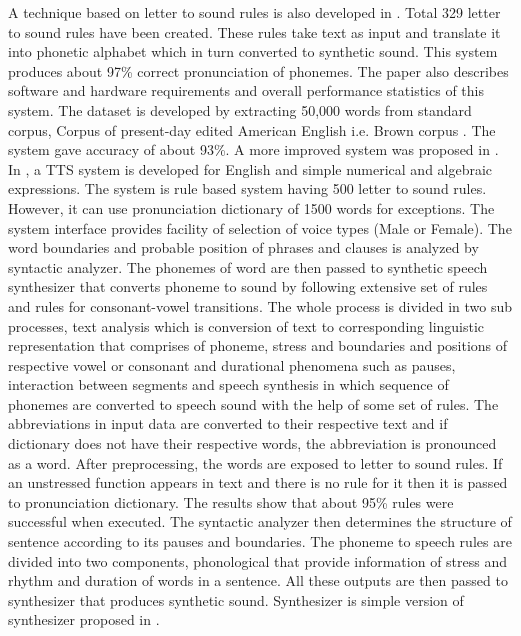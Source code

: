 A technique based on letter to sound rules is also developed in \cite{elovitz1976automatic}. Total 329 letter to sound rules have been created. These rules take text as input and translate it into phonetic alphabet which in turn converted to synthetic sound. This system produces about 97\% correct pronunciation of phonemes. The paper also describes software and hardware requirements and overall performance statistics of this system. The dataset is developed by extracting 50,000 words from standard corpus, Corpus of present-day edited American English i.e. Brown corpus \cite{ku1967computational}. The system gave accuracy of about 93\%. A more improved system was proposed in \cite{carlson1982multi, klatt1982klattalk}. In \cite{klatt1982klattalk}, a TTS system is developed for English and simple numerical and algebraic expressions. The system is rule based system having 500 letter to sound rules. However, it can use pronunciation dictionary of 1500 words for exceptions. The system interface provides facility of selection of voice types (Male or Female). The word boundaries and probable position of phrases and clauses is analyzed by syntactic analyzer. The phonemes of word are then passed to synthetic speech synthesizer that converts phoneme to sound by following extensive set of rules and rules for consonant-vowel transitions. The whole process is divided in two sub processes, text analysis which is conversion of text to corresponding linguistic representation that comprises of phoneme, stress and boundaries and positions of respective vowel or consonant and durational phenomena such as pauses, interaction between segments \cite{klatt1979synthesis} and speech synthesis in which sequence of phonemes are converted to speech sound with the help of some set of rules. The abbreviations in input data are converted to their respective text and if dictionary does not have their respective words, the abbreviation is pronounced as a word. After preprocessing, the words are exposed to letter to sound rules. If an unstressed function appears in text and there is no rule for it then it is passed to pronunciation dictionary. The results show that about 95\% rules were successful when executed. The syntactic analyzer then determines the structure of sentence according to its pauses and boundaries. The phoneme to speech rules are divided into two components, phonological that provide information of stress and rhythm and duration of words in a sentence. All these outputs are then passed to synthesizer that produces synthetic sound. Synthesizer is simple version of synthesizer proposed in \cite{klatt1980software}.

